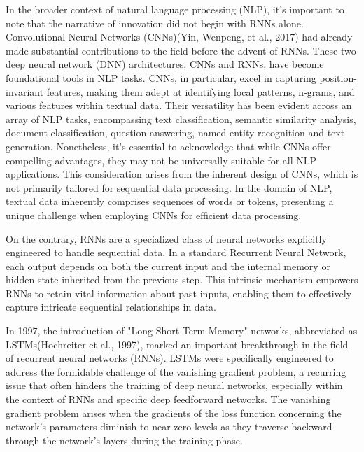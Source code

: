 \documentclass[fleqn,10pt]{thescipub} %
\begin{document}
In the broader context of natural language processing (NLP), it's important to note that the narrative of innovation did not begin with RNNs alone. Convolutional Neural Networks (CNNs)(Yin, Wenpeng, et al., 2017) had already made substantial contributions to the field before the advent of RNNs. These two deep neural network (DNN) architectures, CNNs and RNNs, have become foundational tools in NLP tasks. CNNs, in particular, excel in capturing position-invariant features, making them adept at identifying local patterns, n-grams, and various features within textual data. Their versatility has been evident across an array of NLP tasks, encompassing text classification, semantic similarity analysis, document classification, question answering, named entity recognition and text generation. Nonetheless, it's essential to acknowledge that while CNNs offer compelling advantages, they may not be universally suitable for all NLP applications. This consideration arises from the inherent design of CNNs, which is not primarily tailored for sequential data processing. In the domain of NLP, textual data inherently comprises sequences of words or tokens, presenting a unique challenge when employing CNNs for efficient data processing.


On the contrary, RNNs are a specialized class of neural networks explicitly engineered to handle sequential data. In a standard Recurrent Neural Network, each output depends on both the current input and the internal memory or hidden state inherited from the previous step. This intrinsic mechanism empowers RNNs to retain vital information about past inputs, enabling them to effectively capture intricate sequential relationships in data. 




In 1997, the introduction of "Long Short-Term Memory" networks, abbreviated as LSTMs(Hochreiter et al., 1997), marked an important breakthrough in the field of recurrent neural networks (RNNs). LSTMs were specifically engineered to address the formidable challenge of the vanishing gradient problem, a recurring issue that often hinders the training of deep neural networks, especially within the context of RNNs and specific deep feedforward networks. The vanishing gradient problem arises when the gradients of the loss function concerning the network's parameters diminish to near-zero levels as they traverse backward through the network's layers during the training phase.
\end{document}
